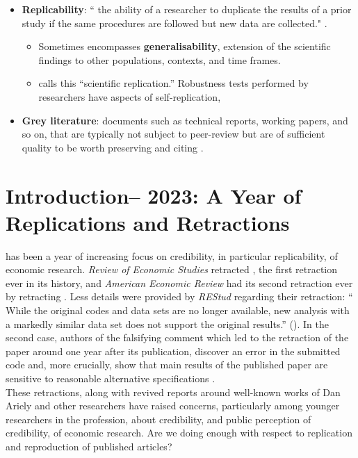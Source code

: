 \documentclass[11pt]{article}
\begin{document}
\begin{itemize}
	\item \textbf{Replicability}: “ the ability of a researcher to duplicate the results of a prior study if the
	same procedures are followed but new data are collected." \cite{bollen2015social}.
	\begin{itemize}
		\item Sometimes encompasses \textbf{generalisability}, extension of the scientific findings to other populations, contexts, and time frames. \cite{vilhuber2020reproducibility}
		\item \cite{hamermesh2007replication} calls this “scientific replication.” Robustness tests performed by researchers have aspects of self-replication,
	\end{itemize}
	\item \textbf{Grey literature}:	documents such as technical reports, working papers, and so on, that are typically not subject to peer-review but are of sufficient quality to be worth preserving and citing \cite{vilhuber2020reproducibility}. 
	
	
\end{itemize}


\newpage
\section{Introduction-- 2023: A Year of Replications and Retractions}

 has been a year of increasing focus on credibility, in particular replicability, of economic research. \textit{Review of Economic Studies} retracted \cite{giuliano2014retracted}, the first retraction ever in its history, and \textit{American Economic Review} had its second retraction ever by retracting \cite{boissel2022dividend}. Less details were provided by \textit{REStud} regarding their retraction: `` While the original codes and data sets are no longer available, new analysis with a markedly similar data set does not support the original results.'' (\cite{restud2023retrac}). In the second case, authors of the falsifying comment which led to the retraction of the paper around one year after its publication, discover an error in the submitted code and, more crucially, show that main results of the published paper are sensitive to reasonable alternative specifications \cite{bach2023dividend}.\\

These retractions, along with revived reports around well-known works of Dan Ariely and other researchers have raised concerns, particularly among younger researchers in the profession, about credibility, and public perception of credibility, of economic research. Are we doing enough with respect to replication and reproduction of published articles?\\
\end{document}
